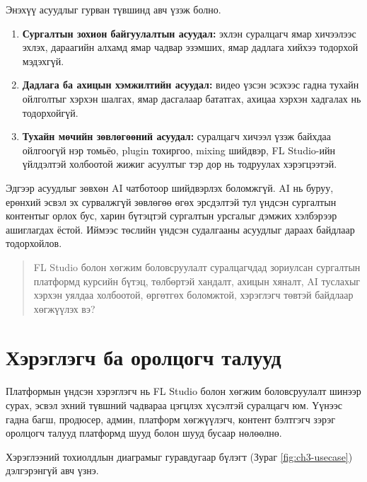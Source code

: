 Энэхүү асуудлыг гурван түвшинд авч үзэж болно.
\begin{enumerate}
  \item \textbf{Сургалтын зохион байгуулалтын асуудал:} эхлэн суралцагч ямар хичээлээс эхлэх, дараагийн алхамд ямар чадвар эзэмших, ямар дадлага хийхээ тодорхой мэдэхгүй.
  \item \textbf{Дадлага ба ахицын хэмжилтийн асуудал:} видео үзсэн эсэхээс гадна тухайн ойлголтыг хэрхэн шалгах, ямар дасгалаар бататгах, ахицаа хэрхэн хадгалах нь тодорхойгүй.
  \item \textbf{Тухайн мөчийн зөвлөгөөний асуудал:} суралцагч хичээл үзэж байхдаа ойлгоогүй нэр томьёо, plugin тохиргоо, mixing шийдвэр, FL Studio-ийн үйлдэлтэй холбоотой жижиг асуултыг тэр дор нь тодруулах хэрэгцээтэй.
\end{enumerate}

Эдгээр асуудлыг зөвхөн AI чатботоор шийдвэрлэх боломжгүй. AI нь буруу, ерөнхий эсвэл эх сурвалжгүй зөвлөгөө өгөх эрсдэлтэй тул үндсэн сургалтын контентыг орлох бус, харин бүтэцтэй сургалтын урсгалыг дэмжих хэлбэрээр ашиглагдах ёстой. Иймээс төслийн үндсэн судалгааны асуудлыг дараах байдлаар тодорхойлов.

\begin{quote}
FL Studio болон хөгжим боловсруулалт суралцагчдад зориулсан сургалтын платформд курсийн бүтэц, төлбөртэй хандалт, ахицын хяналт, AI туслахыг хэрхэн уялдаа холбоотой, өргөтгөх боломжтой, хэрэглэгч төвтэй байдлаар хөгжүүлэх вэ?
\end{quote}

\section{Хэрэглэгч ба оролцогч талууд}
Платформын үндсэн хэрэглэгч нь FL Studio болон хөгжим боловсруулалт шинээр сурах, эсвэл эхний түвшний чадвараа цэгцлэх хүсэлтэй суралцагч юм. Үүнээс гадна багш, продюсер, админ, платформ хөгжүүлэгч, контент бэлтгэгч зэрэг оролцогч талууд платформд шууд болон шууд бусаар нөлөөлнө.

Хэрэглээний тохиолдлын диаграмыг гуравдугаар бүлэгт (Зураг \ref{fig:ch3-usecase}) дэлгэрэнгүй авч үзнэ.

